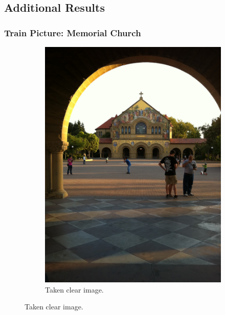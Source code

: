 \graphicspath{{mehul_pics/}}%

\subsection{Additional Results}
\subsubsection{Train Picture: Memorial Church}

\begin{figure}[H]
        \centering
        \begin{subfigure}[b]{0.35\textwidth}
                \centering
                \includegraphics[width=\textwidth]{memchu.jpg}
                \caption{Taken clear image.}
        \end{subfigure}
        

\end{figure}
